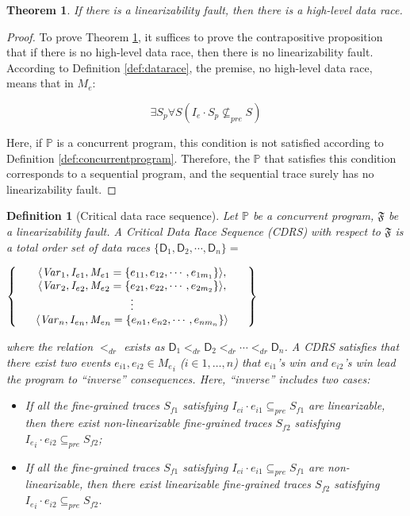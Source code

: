 \documentclass[runningheads]{llncs}
\newcommand{\sset}[1]{\left\{{#1}\right\}}
\newcommand{\se}{\mathit{I_e}}
\newcommand{\ce}{\mathit{M_e}}
\newcommand{\dr}{\mathsf{D}}
\newtheorem{myTheo}{Theorem}
\newtheorem{myDef}{Definition}
\begin{document}
\begin{myTheo}\label{theo:datarace}
   If there is a linearizability fault, then there is a high-level data race.
\end{myTheo}

\begin{proof}
To prove Theorem \ref{theo:datarace}, it suffices to prove the contrapositive proposition that if there is no high-level data race, 
then there is no linearizability fault. According to Definition \ref{def:datarace}, the premise, no high-level data race, means that in $\ce$:

$$\exists S_p \forall S ( \se\cdot S_p \nsubseteq_{pre} S)$$

Here, if $\mathbb{P}$ is a concurrent program, this condition is not satisfied according to Definition \ref{def:concurrentprogram}. 
Therefore, the $\mathbb{P}$ that satisfies this condition corresponds to a sequential program, and the sequential trace surely has no linearizability fault.
\end{proof}


\begin{myDef}[Critical data race sequence]\label{def:cdrs}
    Let  $\mathbb{P}$ be a concurrent program, $\mathfrak{F}$ be a linearizability fault. A \textit{Critical Data Race Sequence} (\textit{CDRS}) with respect to
 $\mathfrak{F}$ is a total order set of data races $\{\mathsf{D}_1,\mathsf{D}_2,\cdots,\mathsf{D}_n\} = $


$\Set{\begin{array}{ccc}
   & \langle\mathit{Var}_1, \se_1, \ce_1 = \sset{e_{11},e_{12},\cdots,e_{1m_1}}\rangle, & \\
   & \langle\mathit{Var}_2, \se_2, \ce_2 = \sset{e_{21},e_{22},\cdots,e_{2m_2}}\rangle, &\\
   & \vdots& \\
   &\langle \mathit{Var}_n, \se_n, \ce_n = \sset{e_{n1},e_{n2},\cdots,e_{nm_n}} \rangle&
   \end{array}}$


\noindent where the relation $<_{dr}$ exists as $\mathsf{D}_1 <_{dr} \dr_2 <_{dr} \cdots  <_{dr} \mathsf{D}_n$.
A CDRS satisfies that there exist two events $e_{i1}, e_{i2}\in \ce_i$ ($i\in{1,\dots,n}$)   that $e_{i1}$'s win and
$e_{i2}$'s win lead the program to ``inverse'' consequences. Here, ``inverse'' includes two cases:
\begin{itemize}
\item If all the fine-grained traces $S_{f1}$ satisfying $I_{ei}\cdot e_{i1} \subseteq_{pre} S_{f1}$ are linearizable, then there exist non-linearizable fine-grained traces $S_{f2}$ satisfying 
$\mathit{\se_i}\cdot e_{i2}\subseteq_{pre} S_{f2}$;
\item If all the fine-grained traces $S_{f1}$ satisfying $I_{ei}\cdot e_{i1} \subseteq_{pre} S_{f1}$ are non-linearizable, then there exist linearizable fine-grained traces $S_{f2}$ satisfying
$\mathit{\se_i}\cdot e_{i2} \subseteq_{pre} S_{f2}$.
\end{itemize}
\end{myDef}
\end{document}
